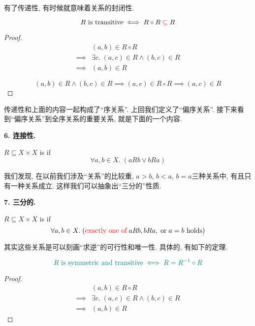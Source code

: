 有了传递性, 有时候就意味着关系的封闭性. 
\begin{theorem}
  \[
    R \text{ is transitive} \iff R \circ R \;\textcolor{red}{\subseteq}\; R
  \]
\end{theorem}
\begin{proof}
  \setcounter{equation}{0}
  \begin{align}
    &(a, b) \in R \circ R \\
    \implies& \exists c.\; (a, c) \in R \land (b, c) \in R \\
    \implies& (a, b) \in R
  \end{align}

  \vspace{0.30cm}
  
    \[
      (a, b) \in R \land (b, c) \in R
      \implies (a, c) \in R \circ R
      \implies (a, c) \in R
    \]
  
\end{proof}

传递性和上面的内容一起构成了``序关系''. 上回我们定义了``偏序关系''. 接下来看到``偏序关系''到全序关系的重要关系, 就是下面的一个内容. 


\textbf{6. 连接性.}

\begin{definition}
  $R \subseteq X \times X$ is  if
  \[
    \forall a, b \in X.\; (a R b \lor b R a)
  \]
\end{definition}

我们发现, 在以前我们涉及``关系''的比较重, $a>b$, $b<a$, $b=a$三种关系中, 有且只有一种关系成立. 这样我们可以抽象出``三分的''性质.  

\textbf{7. 三分的.}

\begin{definition}
  $R \subseteq X \times X$ is  if
  \[
    \forall a, b \in X.\;
      (\text{\textcolor{red}{exactly one of}}\; a R b, b R a, \;\text{or}\; a = b \text{ holds})
  \]
\end{definition}

其实这些关系是可以刻画``求逆''的可行性和唯一性. 具体的, 有如下的定理.

\begin{theorem}
  \[
    \textcolor{teal}{R \text{ is symmetric and transitive} \iff R = R^{-1} \circ R}
  \]
\end{theorem}

\begin{proof}
  \setcounter{equation}{0}
  \begin{align}
    &(a, b) \in R \circ R \\[6pt]
    \implies& \exists c.\; (a, c) \in R \land (b, c) \in R \\
    \implies& (a, b) \in R
  \end{align}
\end{proof}

